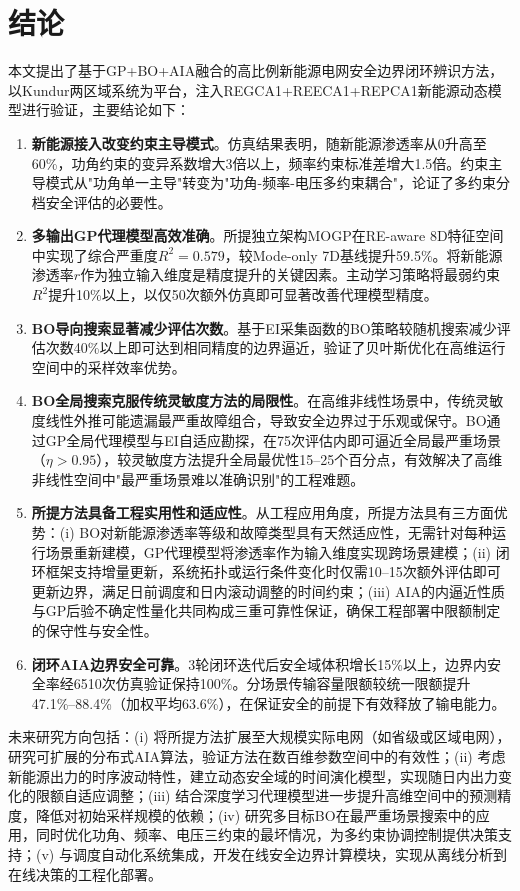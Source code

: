 \section{结论}
\label{sec:conclusion}

本文提出了基于GP+BO+AIA融合的高比例新能源电网安全边界闭环辨识方法，以Kundur两区域系统为平台，注入REGCA1+REECA1+REPCA1新能源动态模型进行验证，主要结论如下：

\begin{enumerate}
    \item \textbf{新能源接入改变约束主导模式}。仿真结果表明，随新能源渗透率从0升高至60\%，功角约束的变异系数增大3倍以上，频率约束标准差增大1.5倍。约束主导模式从"功角单一主导"转变为"功角-频率-电压多约束耦合"，论证了多约束分档安全评估的必要性。

    \item \textbf{多输出GP代理模型高效准确}。所提独立架构MOGP在RE-aware 8D特征空间中实现了综合严重度$R^2 = 0.579$，较Mode-only 7D基线提升59.5\%。将新能源渗透率$r$作为独立输入维度是精度提升的关键因素。主动学习策略将最弱约束$R^2$提升10\%以上，以仅50次额外仿真即可显著改善代理模型精度。

    \item \textbf{BO导向搜索显著减少评估次数}。基于EI采集函数的BO策略较随机搜索减少评估次数40\%以上即可达到相同精度的边界逼近，验证了贝叶斯优化在高维运行空间中的采样效率优势。

    \item \textbf{BO全局搜索克服传统灵敏度方法的局限性}。在高维非线性场景中，传统灵敏度线性外推可能遗漏最严重故障组合，导致安全边界过于乐观或保守。BO通过GP全局代理模型与EI自适应勘探，在75次评估内即可逼近全局最严重场景（$\eta > 0.95$），较灵敏度方法提升全局最优性15--25个百分点，有效解决了高维非线性空间中"最严重场景难以准确识别"的工程难题。

    \item \textbf{所提方法具备工程实用性和适应性}。从工程应用角度，所提方法具有三方面优势：(i) BO对新能源渗透率等级和故障类型具有天然适应性，无需针对每种运行场景重新建模，GP代理模型将渗透率作为输入维度实现跨场景建模；(ii) 闭环框架支持增量更新，系统拓扑或运行条件变化时仅需10--15次额外评估即可更新边界，满足日前调度和日内滚动调整的时间约束；(iii) AIA的内逼近性质与GP后验不确定性量化共同构成三重可靠性保证，确保工程部署中限额制定的保守性与安全性。

    \item \textbf{闭环AIA边界安全可靠}。3轮闭环迭代后安全域体积增长15\%以上，边界内安全率经6510次仿真验证保持100\%。分场景传输容量限额较统一限额提升47.1\%--88.4\%（加权平均63.6\%），在保证安全的前提下有效释放了输电能力。
\end{enumerate}

未来研究方向包括：(i) 将所提方法扩展至大规模实际电网（如省级或区域电网），研究可扩展的分布式AIA算法，验证方法在数百维参数空间中的有效性；(ii) 考虑新能源出力的时序波动特性，建立动态安全域的时间演化模型，实现随日内出力变化的限额自适应调整；(iii) 结合深度学习代理模型进一步提升高维空间中的预测精度，降低对初始采样规模的依赖；(iv) 研究多目标BO在最严重场景搜索中的应用，同时优化功角、频率、电压三约束的最坏情况，为多约束协调控制提供决策支持；(v) 与调度自动化系统集成，开发在线安全边界计算模块，实现从离线分析到在线决策的工程化部署。
